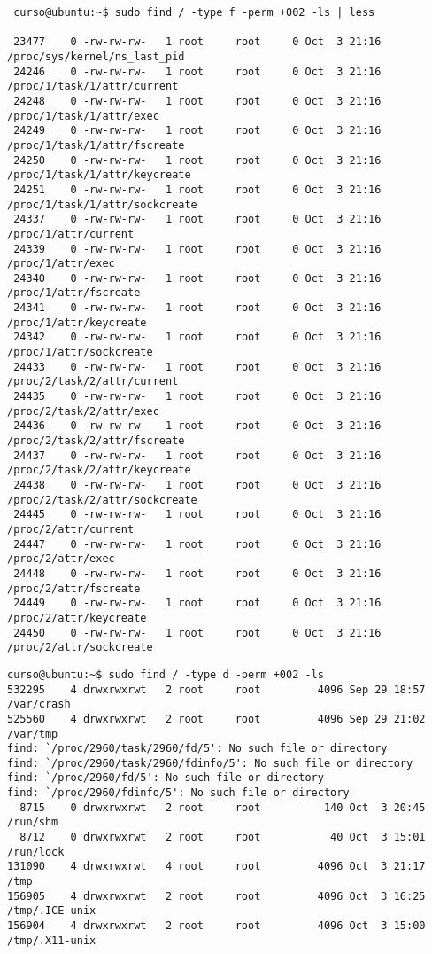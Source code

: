 \documentclass[a4paper,11pt,spanish]{article} %
\newenvironment{myscriptlisting}
{\begin{list}{}{\setlength{\leftmargin}{1em}}\item\scriptsize\bfseries}
{\end{list}}
\begin{document}
\begin{myscriptlisting}
 \begin{verbatim}
 curso@ubuntu:~$ sudo find / -type f -perm +002 -ls | less
 
 23477    0 -rw-rw-rw-   1 root     root     0 Oct  3 21:16 /proc/sys/kernel/ns_last_pid
 24246    0 -rw-rw-rw-   1 root     root     0 Oct  3 21:16 /proc/1/task/1/attr/current
 24248    0 -rw-rw-rw-   1 root     root     0 Oct  3 21:16 /proc/1/task/1/attr/exec
 24249    0 -rw-rw-rw-   1 root     root     0 Oct  3 21:16 /proc/1/task/1/attr/fscreate
 24250    0 -rw-rw-rw-   1 root     root     0 Oct  3 21:16 /proc/1/task/1/attr/keycreate
 24251    0 -rw-rw-rw-   1 root     root     0 Oct  3 21:16 /proc/1/task/1/attr/sockcreate
 24337    0 -rw-rw-rw-   1 root     root     0 Oct  3 21:16 /proc/1/attr/current
 24339    0 -rw-rw-rw-   1 root     root     0 Oct  3 21:16 /proc/1/attr/exec
 24340    0 -rw-rw-rw-   1 root     root     0 Oct  3 21:16 /proc/1/attr/fscreate
 24341    0 -rw-rw-rw-   1 root     root     0 Oct  3 21:16 /proc/1/attr/keycreate
 24342    0 -rw-rw-rw-   1 root     root     0 Oct  3 21:16 /proc/1/attr/sockcreate
 24433    0 -rw-rw-rw-   1 root     root     0 Oct  3 21:16 /proc/2/task/2/attr/current
 24435    0 -rw-rw-rw-   1 root     root     0 Oct  3 21:16 /proc/2/task/2/attr/exec
 24436    0 -rw-rw-rw-   1 root     root     0 Oct  3 21:16 /proc/2/task/2/attr/fscreate
 24437    0 -rw-rw-rw-   1 root     root     0 Oct  3 21:16 /proc/2/task/2/attr/keycreate
 24438    0 -rw-rw-rw-   1 root     root     0 Oct  3 21:16 /proc/2/task/2/attr/sockcreate
 24445    0 -rw-rw-rw-   1 root     root     0 Oct  3 21:16 /proc/2/attr/current
 24447    0 -rw-rw-rw-   1 root     root     0 Oct  3 21:16 /proc/2/attr/exec
 24448    0 -rw-rw-rw-   1 root     root     0 Oct  3 21:16 /proc/2/attr/fscreate
 24449    0 -rw-rw-rw-   1 root     root     0 Oct  3 21:16 /proc/2/attr/keycreate
 24450    0 -rw-rw-rw-   1 root     root     0 Oct  3 21:16 /proc/2/attr/sockcreate
 \end{verbatim}
\end{myscriptlisting}

\begin{myscriptlisting}
 \begin{verbatim}
curso@ubuntu:~$ sudo find / -type d -perm +002 -ls
532295    4 drwxrwxrwt   2 root     root         4096 Sep 29 18:57 /var/crash
525560    4 drwxrwxrwt   2 root     root         4096 Sep 29 21:02 /var/tmp
find: `/proc/2960/task/2960/fd/5': No such file or directory
find: `/proc/2960/task/2960/fdinfo/5': No such file or directory
find: `/proc/2960/fd/5': No such file or directory
find: `/proc/2960/fdinfo/5': No such file or directory
  8715    0 drwxrwxrwt   2 root     root          140 Oct  3 20:45 /run/shm
  8712    0 drwxrwxrwt   2 root     root           40 Oct  3 15:01 /run/lock
131090    4 drwxrwxrwt   4 root     root         4096 Oct  3 21:17 /tmp
156905    4 drwxrwxrwt   2 root     root         4096 Oct  3 16:25 /tmp/.ICE-unix
156904    4 drwxrwxrwt   2 root     root         4096 Oct  3 15:00 /tmp/.X11-unix
 \end{verbatim}
\end{myscriptlisting}
\end{document}

